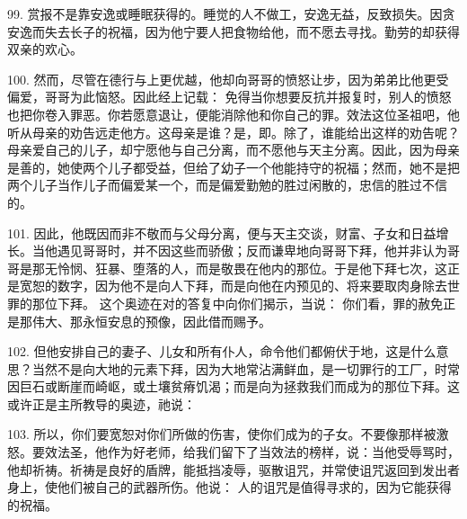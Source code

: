99. 赏报不是靠安逸或睡眠获得的。睡觉的人不做工，安逸无益，反致损失。因贪安逸而失去长子的祝福，因为他宁要人把食物给他，而不愿去寻找。勤劳的却获得双亲的欢心。\par

100. 然而，尽管在德行与上更优越，他却向哥哥的愤怒让步，因为弟弟比他更受偏爱，哥哥为此恼怒。因此经上记载： 免得当你想要反抗并报复时，别人的愤怒也把你卷入罪恶。你若愿意退让，便能消除他和你自己的罪。效法这位圣祖吧，他听从母亲的劝告远走他方。这母亲是谁？是，即。除了，谁能给出这样的劝告呢？母亲爱自己的儿子，却宁愿他与自己分离，而不愿他与天主分离。因此，因为母亲是善的，她使两个儿子都受益，但给了幼子一个他能持守的祝福；然而，她不是把两个儿子当作儿子而偏爱某一个，而是偏爱勤勉的胜过闲散的，忠信的胜过不信的。\par

101. 因此，他既因而非不敬而与父母分离，便与天主交谈，财富、子女和日益增长。当他遇见哥哥时，并不因这些而骄傲；反而谦卑地向哥哥下拜，他并非认为哥哥是那无怜悯、狂暴、堕落的人，而是敬畏在他内的那位。于是他下拜七次，这正是宽恕的数字，因为他不是向人下拜，而是向他在内预见的、将来要取肉身除去世罪的那位下拜。 这个奥迹在对的答复中向你们揭示，当说： 你们看，罪的赦免正是那伟大、那永恒安息的预像，因此借而赐予。\par

102. 但他安排自己的妻子、儿女和所有仆人，命令他们都俯伏于地，这是什么意思？当然不是向大地的元素下拜，因为大地常沾满鲜血，是一切罪行的工厂，时常因巨石或断崖而崎岖，或土壤贫瘠饥渴；而是向为拯救我们而成为的那位下拜。这或许正是主所教导的奥迹，祂说：\par

103. 所以，你们要宽恕对你们所做的伤害，使你们成为的子女。不要像那样被激怒。要效法圣，他作为好老师，给我们留下了当效法的榜样，说：当他受辱骂时，他却祈祷。祈祷是良好的盾牌，能抵挡凌辱，驱散诅咒，并常使诅咒返回到发出者身上，使他们被自己的武器所伤。他说： 人的诅咒是值得寻求的，因为它能获得的祝福。\par

